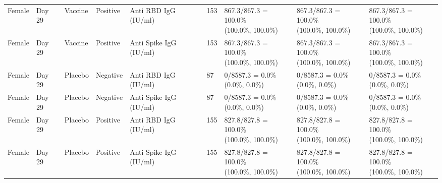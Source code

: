 \documentclass[]{book}
\theoremstyle{definition}
\theoremstyle{definition}
\theoremstyle{definition}
\newcommand{\1}{\mathbbm{1}}
\begin{document}
\begin{landscape}
\begin{ThreePartTable}
\begin{longtable}[t]{>{\raggedright\arraybackslash}p{2.7cm}llllllll}
\hspace{1em}Female & Day 29 & Vaccine & Positive & Anti RBD IgG (IU/ml) & 153 & \makecell[l]{867.3/867.3 = 100.0\%\\(100.0\%, 100.0\%)} & \makecell[l]{867.3/867.3 = 100.0\%\\(100.0\%, 100.0\%)} & \makecell[l]{867.3/867.3 = 100.0\%\\(100.0\%, 100.0\%)}\\
\hspace{1em}Female & Day 29 & Vaccine & Positive & Anti Spike IgG (IU/ml) & 153 & \makecell[l]{867.3/867.3 = 100.0\%\\(100.0\%, 100.0\%)} & \makecell[l]{867.3/867.3 = 100.0\%\\(100.0\%, 100.0\%)} & \makecell[l]{867.3/867.3 = 100.0\%\\(100.0\%, 100.0\%)}\\
\hspace{1em}Female & Day 29 & Placebo & Negative & Anti RBD IgG (IU/ml) & 87 & \makecell[l]{0/8587.3 = 0.0\%\\(0.0\%, 0.0\%)} & \makecell[l]{0/8587.3 = 0.0\%\\(0.0\%, 0.0\%)} & \makecell[l]{0/8587.3 = 0.0\%\\(0.0\%, 0.0\%)}\\
\hspace{1em}Female & Day 29 & Placebo & Negative & Anti Spike IgG (IU/ml) & 87 & \makecell[l]{0/8587.3 = 0.0\%\\(0.0\%, 0.0\%)} & \makecell[l]{0/8587.3 = 0.0\%\\(0.0\%, 0.0\%)} & \makecell[l]{0/8587.3 = 0.0\%\\(0.0\%, 0.0\%)}\\
\hspace{1em}Female & Day 29 & Placebo & Positive & Anti RBD IgG (IU/ml) & 155 & \makecell[l]{827.8/827.8 = 100.0\%\\(100.0\%, 100.0\%)} & \makecell[l]{827.8/827.8 = 100.0\%\\(100.0\%, 100.0\%)} & \makecell[l]{827.8/827.8 = 100.0\%\\(100.0\%, 100.0\%)}\\
\hspace{1em}Female & Day 29 & Placebo & Positive & Anti Spike IgG (IU/ml) & 155 & \makecell[l]{827.8/827.8 = 100.0\%\\(100.0\%, 100.0\%)} & \makecell[l]{827.8/827.8 = 100.0\%\\(100.0\%, 100.0\%)} & \makecell[l]{827.8/827.8 = 100.0\%\\(100.0\%, 100.0\%)}\\

\end{longtable}
\end{ThreePartTable}
\end{landscape}
\end{document}
